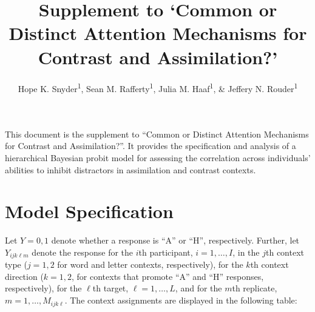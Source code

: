 \documentclass[english,man]{apa6}
\title{Supplement to `Common or Distinct Attention Mechanisms for Contrast and
Assimilation?'}
\author{Hope K. Snyder\textsuperscript{1}, Sean M. Rafferty\textsuperscript{1}, Julia M. Haaf\textsuperscript{1}, \& Jeffery N. Rouder\textsuperscript{1}}
\affiliation{
    \vspace{0.5cm}
          \textsuperscript{1} University of Missouri  }
\begin{document}
\maketitle

\setcounter{secnumdepth}{0}



This document is the supplement to \enquote{Common or Distinct Attention
Mechanisms for Contrast and Assimilation?}. It provides the
specification and analysis of a hierarchical Bayesian probit model for
assessing the correlation across individuals' abilities to inhibit
distractors in assimilation and contrast contexts.

\section{Model Specification}\label{model-specification}

Let \(Y=0,1\) denote whether a response is \enquote{A} or \enquote{H},
respectively. Further, let \(Y_{ijk\ell m}\) denote the response for the
\(i\)th participant, \(i=1,\ldots,I\), in the \(j\)th context type
(\(j=1,2\) for word and letter contexts, respectively), for the \(k\)th
context direction (\(k=1,2\), for contexts that promote \enquote{A} and
\enquote{H} responses, respectively), for the \(\ell\)th target,
\(\ell=1,\ldots,L\), and for the \(m\)th replicate,
\(m=1,\ldots ,M_{ijk\ell}\). The context assignments are displayed in
the following table:
\end{document}
